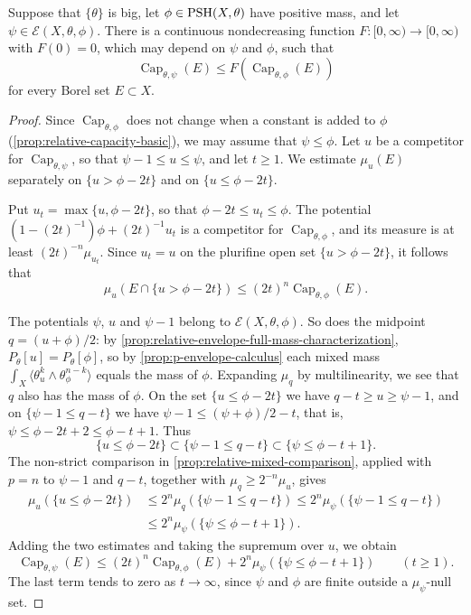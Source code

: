 \begin{lemma}\label{lem:full-mass-capacity-downward-comparison}
Suppose that $\{\theta\}$ is big, let $\phi\in\mathrm{PSH}(X,\theta)$ have positive mass, and let $\psi\in\mathcal E(X,\theta,\phi)$. There is a continuous nondecreasing function $F\colon[0,\infty)\to[0,\infty)$ with $F(0)=0$, which may depend on $\psi$ and $\phi$, such that
\[
 \operatorname{Cap}_{\theta,\psi}(E)
                      \leq F(\operatorname{Cap}_{\theta,\phi}(E))
\]
for every Borel set $E\subset X$.
\end{lemma}
\begin{proof}
Since $\operatorname{Cap}_{\theta,\phi}$ does not change when a constant is added to $\phi$ (\cref{prop:relative-capacity-basic}), we may assume that $\psi\leq\phi$. Let $u$ be a competitor for $\operatorname{Cap}_{\theta,\psi}$, so that $\psi-1\leq u\leq\psi$, and let $t\geq1$. We estimate $\mu_u(E)$ separately on $\{u>\phi-2t\}$ and on $\{u\leq\phi-2t\}$.

Put $u_t=\max\{u,\phi-2t\}$, so that $\phi-2t\leq u_t\leq\phi$. The potential $(1-(2t)^{-1})\phi+(2t)^{-1}u_t$ is a competitor for $\operatorname{Cap}_{\theta,\phi}$, and its measure is at least $(2t)^{-n}\mu_{u_t}$. Since $u_t=u$ on the plurifine open set $\{u>\phi-2t\}$, it follows that
\[
 \mu_u(E\cap\{u>\phi-2t\})
                       \leq(2t)^n\operatorname{Cap}_{\theta,\phi}(E).
\]

The potentials $\psi$, $u$ and $\psi-1$ belong to $\mathcal E(X,\theta,\phi)$. So does the midpoint $q=(u+\phi)/2$: by \cref{prop:relative-envelope-full-mass-characterization}, $P_\theta[u]=P_\theta[\phi]$, so by \cref{prop:p-envelope-calculus} each mixed mass $\int_X\langle\theta_u^k\wedge\theta_\phi^{n-k}\rangle$ equals the mass of $\phi$. Expanding $\mu_q$ by multilinearity, we see that $q$ also has the mass of $\phi$. On the set $\{u\leq\phi-2t\}$ we have $q-t\geq u\geq\psi-1$, and on $\{\psi-1\leq q-t\}$ we have $\psi-1\leq(\psi+\phi)/2-t$, that is, $\psi\leq\phi-2t+2\leq\phi-t+1$. Thus
\[
 \{u\leq\phi-2t\}\subset\{\psi-1\leq q-t\}
                         \subset\{\psi\leq\phi-t+1\}.
\]
The non-strict comparison in \cref{prop:relative-mixed-comparison}, applied with $p=n$ to $\psi-1$ and $q-t$, together with $\mu_q\geq2^{-n}\mu_u$, gives
\[
 \begin{split}
 \mu_u(\{u\leq\phi-2t\})&\leq2^n\mu_q(\{\psi-1\leq q-t\})
     \leq2^n\mu_\psi(\{\psi-1\leq q-t\})\\
  &\leq2^n\mu_\psi(\{\psi\leq\phi-t+1\}).
 \end{split}
\]
Adding the two estimates and taking the supremum over $u$, we obtain
\begin{equation}\label{eq:full-mass-capacity-tail-bound}
 \operatorname{Cap}_{\theta,\psi}(E)
 \leq(2t)^n\operatorname{Cap}_{\theta,\phi}(E)
                 +2^n\mu_\psi(\{\psi\leq\phi-t+1\})
 \qquad(t\geq1).
\end{equation}
The last term tends to zero as $t\to\infty$, since $\psi$ and $\phi$ are finite outside a $\mu_\psi$-null set.


\end{proof}

